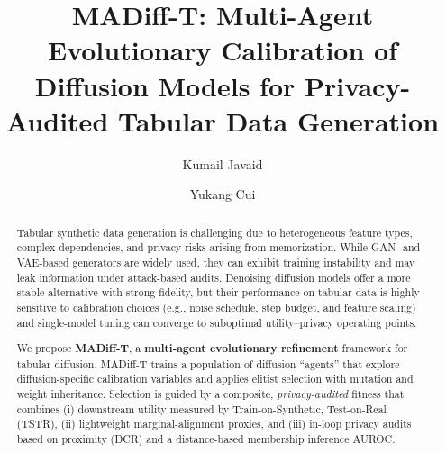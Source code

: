\documentclass[preprint,12pt]{elsarticle}
\begin{document}

\begin{frontmatter}

\title{MADiff-T: Multi-Agent Evolutionary Calibration of Diffusion Models for Privacy-Audited Tabular Data Generation}



\author[aff1]{Kumail Javaid}
\author[aff1]{Yukang Cui}


\address[aff1]{College of Mechatronics and Control Engineering, Shenzhen University, Shenzhen, China}

\begin{abstract}
Tabular synthetic data generation is challenging due to heterogeneous feature types, complex dependencies, and privacy risks arising from memorization. While GAN- and VAE-based generators are widely used, they can exhibit training instability and may leak information under attack-based audits. Denoising diffusion models offer a more stable alternative with strong fidelity, but their performance on tabular data is highly sensitive to calibration choices (e.g., noise schedule, step budget, and feature scaling) and single-model tuning can converge to suboptimal utility--privacy operating points.

We propose \textbf{MADiff-T}, a \textbf{multi-agent evolutionary refinement} framework for tabular diffusion. MADiff-T trains a population of diffusion ``agents'' that explore diffusion-specific calibration variables and applies elitist selection with mutation and weight inheritance. Selection is guided by a composite, \emph{privacy-audited} fitness that combines (i) downstream utility measured by Train-on-Synthetic, Test-on-Real (TSTR), (ii) lightweight marginal-alignment proxies, and (iii) in-loop privacy audits based on proximity (DCR) and a distance-based membership inference AUROC.


\end{abstract}
\end{frontmatter}
\end{document}
